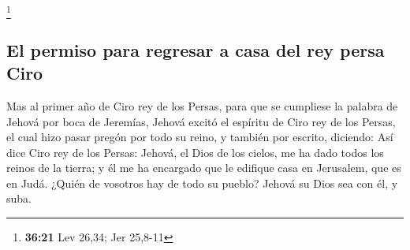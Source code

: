 \footnote{\textbf{36:21} Lev 26,34; Jer 25,8-11}

\hypertarget{el-permiso-para-regresar-a-casa-del-rey-persa-ciro}{%
\subsection{El permiso para regresar a casa del rey persa
Ciro}\label{el-permiso-para-regresar-a-casa-del-rey-persa-ciro}}

 Mas al primer año de Ciro rey de los Persas, para que se
cumpliese la palabra de Jehová por boca de Jeremías, Jehová excitó el
espíritu de Ciro rey de los Persas, el cual hizo pasar pregón por todo
su reino, y también por escrito, diciendo:  Así dice Ciro
rey de los Persas: Jehová, el Dios de los cielos, me ha dado todos los
reinos de la tierra; y él me ha encargado que le edifique casa en
Jerusalem, que es en Judá. ¿Quién de vosotros hay de todo su pueblo?
Jehová su Dios sea con él, y suba.
